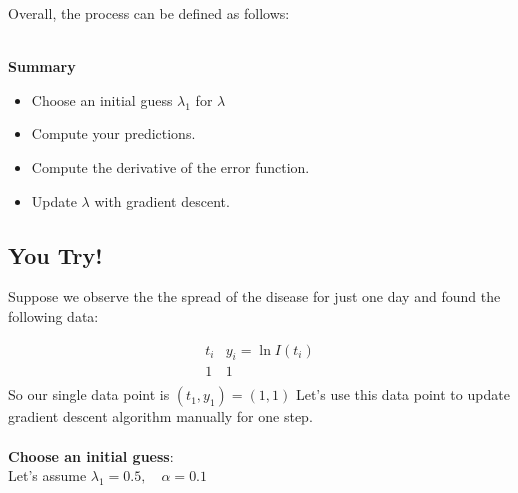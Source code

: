 \documentclass[11pt]{article}
\begin{document}
\begin{enumerate}
Overall, the process can be defined as follows:\\
\vspace{0.5cm}\

\textbf{Summary}
\begin{itemize}
    \item Choose an initial guess $\lambda_1$ for $\lambda$\\
    \item Compute your predictions.
    \item Compute the derivative of the error function.\\
    \item Update $\lambda$ with gradient descent.
\end{itemize}
\end{enumerate}
\newpage
\subsection*{You Try!}

Suppose we observe the the spread of the disease for just one day and found the following data:

\[
\begin{array}{c|c}
t_i & y_i = \ln I(t_i) \\
\hline
1 & 1 \\
\end{array}
\]
So our single data point is $(t_1,y_1)=(1,1)$ Let's use this data point to update gradient descent algorithm manually for one step.\\\\
{\bf Choose an initial guess}:  \\ Let's assume
$\lambda_1 = 0.5, \quad \alpha = 0.1$\\
\\
\end{document}
